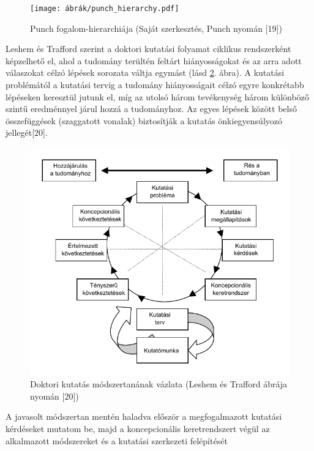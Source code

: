 \documentclass[12pt,magyar,a4paper,oneside]{scrreprt}
\begin{document}
\begin{figure}
\hypertarget{fig:punch}{%
\centering
\texttt{[image: ábrák/punch\_hierarchy.pdf]}
\caption{Punch fogalom-hierarchiája (Saját szerkesztés, Punch nyomán
{[}19{]})}\label{fig:punch}
}
\end{figure}

Leshem és Trafford szerint a doktori kutatási folyamat ciklikus
rendszerként képzelhető el, ahol a tudomány terültén feltárt
hiányosságokat és az arra adott válaszokat célzó lépések sorozata váltja
egymást (lásd \ref{fig:doktori}. ábra). A kutatási problémától a
kutatási tervig a tudomány hiányosságait célzó egyre konkrétabb
lépéseken keresztül jutunk el, míg az utolsó három tevékenység három
különböző szintű eredménnyel járul hozzá a tudományhoz. Az egyes lépések
között belső összefüggések (szaggatott vonalak) biztosítják a kutatás
önkiegyensúlyozó jellegét{[}20{]}.

\begin{figure}
\hypertarget{fig:doktori}{%
\centering
\includegraphics{ábrák/doktori-kutatás-vizualizációja_Leshem.pdf}
\caption{Doktori kutatás módszertanának vázlata (Leshem és Trafford
ábrája nyomán {[}20{]})}\label{fig:doktori}
}
\end{figure}

A javasolt módszertan mentén haladva először a megfogalmazott kutatási
kérdéseket mutatom be, majd a koncepcionális keretrendszert végül az
alkalmazott módszereket és a kutatási szerkezeti felépítését
\end{document}
